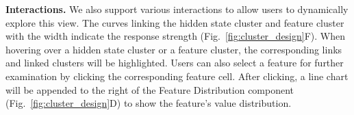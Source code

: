 \textbf{Interactions.}
We also support various interactions to allow users to dynamically explore this view.
The curves linking the hidden state cluster and feature cluster with the width indicate the response strength (Fig.~\ref{fig:cluster_design}F).
When hovering over a hidden state cluster or a feature cluster, the corresponding links and linked clusters will be highlighted.
Users can also select a feature for further examination by clicking the corresponding feature cell.
After clicking, a line chart will be appended to the right of the Feature Distribution component (Fig.~\ref{fig:cluster_design}D) to show the feature's value distribution.
